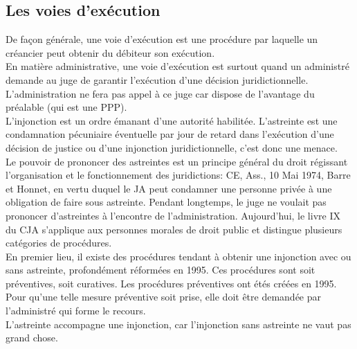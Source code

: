 \documentclass[10pt, a4paper, openany]{book}
\begin{document}
\subsection{Les voies d'exécution}

De façon générale, une voie d'exécution est une procédure par laquelle un créancier peut obtenir du débiteur son exécution. \\
En matière administrative, une voie d'exécution est surtout quand un administré demande au juge de garantir l'exécution d'une décision juridictionnelle. L'administration ne fera pas appel à ce juge car dispose de l'avantage du préalable (qui est une PPP). \\
L'injonction est un ordre émanant d'une autorité habilitée. L'astreinte est une condamnation pécuniaire éventuelle par jour de retard dans l'exécution d'une décision de justice ou d'une injonction juridictionnelle, c'est donc une menace. \\
Le pouvoir de prononcer des astreintes est un principe général du droit régissant l'organisation et le fonctionnement des juridictions: CE, Ass., 10 Mai 1974, Barre et Honnet, en vertu duquel le JA peut condamner une personne privée à une obligation de faire sous astreinte. Pendant longtemps, le juge ne voulait pas prononcer d'astreintes à l'encontre de l'administration. Aujourd'hui, le livre IX du CJA s'applique aux personnes morales de droit public et distingue plusieurs catégories de procédures. \\
En premier lieu, il existe des procédures tendant à obtenir une injonction avec ou sans astreinte, profondément réformées en 1995. Ces procédures sont soit préventives, soit curatives. Les procédures préventives ont étés créées en 1995. Pour qu'une telle mesure préventive soit prise, elle doit être demandée par l'administré qui forme le recours. \\
L'astreinte accompagne une injonction, car l'injonction sans astreinte ne vaut pas grand chose.
\end{document}
